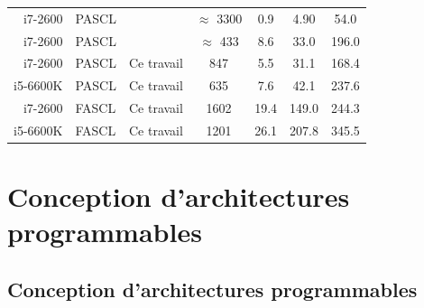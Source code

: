 \documentclass[t,compress,mathserif,12pt,xcolor=dvipsnames]{beamer}
\begin{document}
\begin{frame}
\begin{table}[ht]
{{\begin{tabular}{r|l|c|c|c c c}
        i7-2600  & PASCL &~\cite{sarkis_increasing_2014}    & $\approx$ 3300                 & 0.9             & 4.90            & 54.0            \\
        i7-2600  & PASCL &~\cite{sarkis_fast_2016}          & $\approx$ 433                  & 8.6             & 33.0            & 196.0           \\
        i7-2600  & PASCL & Ce travail                       & 847                            & 5.5             & 31.1            & 168.4           \\
        i5-6600K & PASCL & Ce travail                       & 635                            & 7.6             & 42.1            & 237.6           \\
        \hline
        i7-2600  & FASCL & Ce travail                       & 1602                           & 19.4            & 149.0           & 244.3           \\
        i5-6600K & FASCL & Ce travail                       & 1201                           & 26.1            & 207.8           & 345.5           \\
      \end{tabular}
      }}
 
  \end{table}
\end{frame}

\section{Conception d'architectures programmables}



\subsection*{Conception d'architectures programmables}
\end{document}
